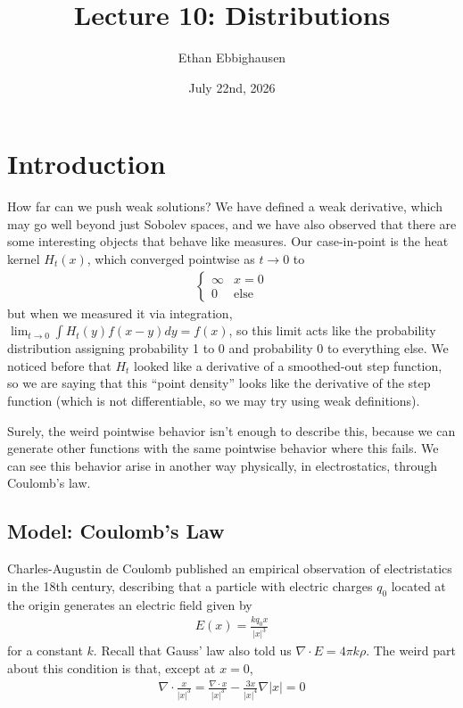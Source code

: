 \documentclass{article}
\title{Lecture 10: Distributions}
\author{Ethan Ebbighausen}
\date{July 22nd, 2026}
\begin{document}
	\pagestyle{fancy}
	\fancyfoot{} 
	
	\maketitle
	
	\section{Introduction}
	
	How far can we push weak solutions? We have defined a weak derivative, which may go well beyond just Sobolev spaces, and we have also observed that there are some interesting objects that behave like measures. Our case-in-point is the heat kernel $H_{t}(x)$, which converged pointwise as $t \to 0$ to 
	\begin{align*}
		\begin{cases}
			\infty & x = 0\\ 0 & \text{else}
		\end{cases}
	\end{align*}
	but when we measured it via integration, $\lim_{t \to 0} \int H_{t}(y)f(x-y)dy = f(x)$, so this limit acts like the probability distribution assigning probability 1 to $0$ and probability $0$ to everything else. We noticed before that $H_{t}$ looked like a derivative of a smoothed-out step function, so we are saying that this ``point density'' looks like the derivative of the step function (which is not differentiable, so we may try using weak definitions). 
	
	Surely, the weird pointwise behavior isn't enough to describe this, because we can generate other functions with the same pointwise behavior where this fails. We can see this behavior arise in another way physically, in electrostatics, through Coulomb's law. 
	
	
	\subsection{Model: Coulomb's Law}
	
	Charles-Augustin de Coulomb published an empirical observation of electristatics in the 18th century, describing that a particle with electric charges $q_0$ located at the origin generates an electric field given by 
	\begin{align*}
		E(x) = \frac{kq_0x}{|x|^{3}}
	\end{align*}
	for a constant $k$. Recall that Gauss' law also told us $\nabla \cdot E = 4 \pi k \rho$. The weird part about this condition is that, except at $x=0$, 
	\begin{align*}
		\nabla \cdot \frac{x}{|x|^{3}} = \frac{\nabla \cdot x}{|x|^{3}} - \frac{3x}{|x|^{4}} \nabla |x| = 0
	\end{align*}
	
\end{document}
